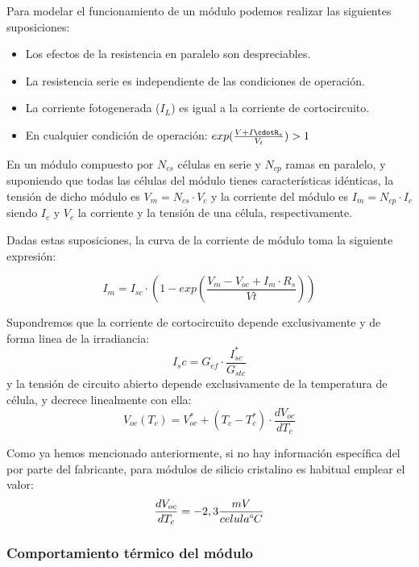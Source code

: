 Para modelar el funcionamiento de un módulo podemos realizar las siguientes suposiciones:
\begin{itemize}
\item Los efectos de la resistencia en paralelo son despreciables.
\item La resistencia serie es independiente de las condiciones de operación.
\item La corriente fotogenerada ($I_L$) es igual a la corriente de cortocircuito.
\item En cualquier condición de operación: $exp(\frac{V+I\cdotR_s}{V_t}) > 1$
\end{itemize}

En un módulo compuesto por $N_{cs}$ células en serie y $N_{cp}$ ramas en paralelo, y suponiendo que todas las células del módulo tienes características idénticas, la tensión de dicho módulo es $V_m= N_{cs} \cdot V_c$ y la corriente del módulo es $I_m = N_{cp} \cdot I_c$ siendo $I_c$ y $V_c$ la corriente y la tensión de  una célula, respectivamente.

Dadas estas suposiciones, la curva de la corriente de módulo toma la siguiente expresión:

\begin{equation}
I_m = I_{sc} \cdot \left( 1 - exp \left(\frac{V_m - V_{oc} + I_m \cdot R_s}{Vt}\right) \right)
\end{equation}

Supondremos que la corriente de cortocircuito depende exclusivamente y de forma linea de la irradiancia:
\begin{equation}
\label{eqn_I_sc}
I_sc = G_{ef} \cdot \frac{I_{sc}^*}{G_{stc}}
\end{equation}
y la tensión de circuito abierto depende exclusivamente de la temperatura de célula, y decrece linealmente con ella:
\begin{equation}
\label{eqn_V_oc}
V_{oc}(T_c) = V_{oc}^* + (T_c - T_c^*) \cdot \frac{dV_{oc}}{dT_c}
\end{equation}

Como ya hemos mencionado anteriormente, si no hay información específica del por parte del fabricante, para módulos de silicio cristalino es habitual emplear el valor:
\begin{equation}
\frac{dV_{oc}}{dT_c}=-2,3\frac{mV}{ celula \degree C}
\end{equation}

\subsubsection{Comportamiento térmico del módulo}


